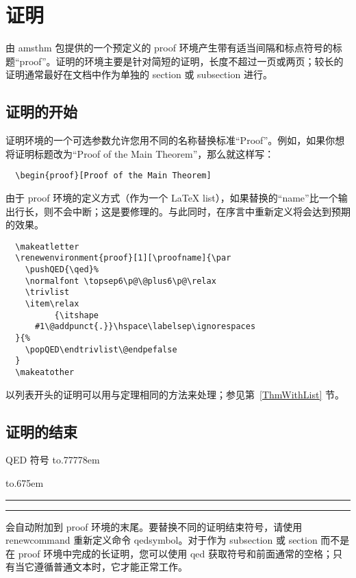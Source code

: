 \documentclass{article}
\providecommand{\qq}[1]{“#1”}
\newcommand{\ntt}{%
  \fontfamily\ttdefault \fontseries\mddefault \fontshape\updefault
  \selectfont
}
\DeclareRobustCommand{\cn}[1]{{\ntt\bslchar#1}}
\DeclareRobustCommand{\pkg}[1]{\textsf{#1}}
\DeclareRobustCommand{\env}[1]{{\ntt#1}}
\providecommand{\qedsymbol}{\leavevmode
  \hbox to.77778em{%
  \hfil\vrule
  \vbox to.675em{\hrule width.6em\vfil\hrule}%
  \vrule\hfil}}
\def\latex/{{\protect\LaTeX}}
\begin{document}


\section{证明}

由 \pkg{amsthm} 包提供的一个预定义的 \env{proof} 环境产生带有适当间隔和标点符号的标题\qq{proof}。证明的环境主要是针对简短的证明，长度不超过一页或两页；较长的证明通常最好在文档中作为单独的 \cn{section} 或 \cn{subsection} 进行。

\subsection{证明的开始}

证明环境的一个可选参数允许您用不同的名称替换标准\qq{Proof}。例如，如果你想将证明标题改为\qq{Proof of the Main Theorem}，那么就这样写：
\begin{verbatim}
  \begin{proof}[Proof of the Main Theorem]
\end{verbatim}

由于 \env{proof} 环境的定义方式（作为一个 \latex/ list），如果替换的“name”比一个输出行长，则不会中断；这是要修理的。与此同时，在序言中重新定义将会达到预期的效果。
\begin{verbatim}
  \makeatletter
  \renewenvironment{proof}[1][\proofname]{\par
    \pushQED{\qed}%
    \normalfont \topsep6\p@\@plus6\p@\relax
    \trivlist
    \item\relax
          {\itshape
      #1\@addpunct{.}}\hspace\labelsep\ignorespaces
  }{%
    \popQED\endtrivlist\@endpefalse
  }
  \makeatother
\end{verbatim}

以列表开头的证明可以用与定理相同的方法来处理；参见第~\ref{ThmWithList} 节。

\subsection{证明的结束}

QED 符号 \qedsymbol{} 会自动附加到 \env{proof} 环境的末尾。要替换不同的证明结束符号，请使用 \cn{renewcommand} 重新定义命令 \cn{qedsymbol}。对于作为 subsection 或 section 而不是在 \env{proof} 环境中完成的长证明，您可以使用 \cn{qed} 获取符号和前面通常的空格；只有当它遵循普通文本时，它才能正常工作。
\end{document}
